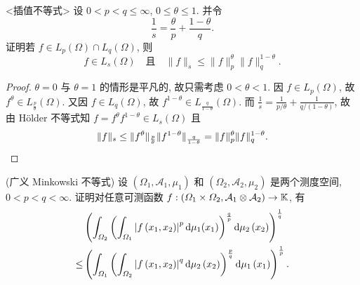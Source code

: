 \begin{exercise}<插值不等式>
    设 $0<p<q\leq\infty$, $0\leq\theta\leq 1$. 并令
    \[\frac{1}{s}=\frac{\theta}{p}+\frac{1-\theta}{q}.\]
    证明若 $f\in L_p(\varOmega)\cap L_q(\varOmega)$, 则
    \[f\in L_s(\varOmega)\quad\text{且}\quad \|f\|_s\leq\|f\|_p^{\theta}\|f\|_q^{1-\theta}.\]
\end{exercise}

\begin{proof}
    $\theta=0$ 与 $\theta=1$ 的情形是平凡的, 故只需考虑 $0<\theta<1$.
    因 $f\in L_p(\varOmega)$, 故 $f^{\theta}\in L_{\frac{p}{\theta}}(\varOmega)$.
    又因 $f\in L_q(\varOmega)$, 故 $f^{1-\theta}\in L_{\frac{q}{1-\theta}}(\varOmega)$.
    而 $\frac{1}{s}=\frac{1}{p/\theta}+\frac{1}{q/(1-\theta)}$, 故由 H\"older 不等式知
    $f=f^{\theta}f^{1-\theta}\in L_s(\varOmega)$ 且
    \[\|f\|_s\leq\|f^{\theta}\|_{\frac{p}{\theta}} \|f^{1-\theta}\|_{\frac{q}{1-\theta}}=\|f\|_p^{\theta} \|f\|_q^{1-\theta}.\qedhere\]
\end{proof}


\begin{exercise}(广义 Minkowski 不等式) 
    设 $\left(\varOmega_{1}, \mathcal{A}_{1}, \mu_{1}\right)$ 
    和 $\left(\varOmega_{2}, \mathcal{A}_{2}, \mu_{2}\right)$ 是两个测度空间, $0<p<q<\infty$. 
    证明对任意可测函数 
    $f:\left(\varOmega_{1} \times \varOmega_{2}, \mathcal{A}_{1} \otimes \mathcal{A}_{2}\right) \rightarrow\mathbb{K}$, 有
    \begin{align*}
        &\left(\int_{\varOmega_{2}}\left(\int_{\varOmega_{1}}\left|f\left(x_{1}, x_{2}\right)\right|^{p}\mathop{}\!\mathrm{d}\mu_{1}(x_{1})\right)^{\frac{q}{p}}\mathop{}\!\mathrm{d} \mu_{2}\left(x_{2}\right)\right)^{\frac{1}{q}} \\
   \leq &\left(\int_{\varOmega_{1}}\left(\int_{\varOmega_{2}}\left|f\left(x_{1}, x_{2}\right)\right|^{q}\mathop{}\!\mathrm{d}\mu_{2}\left(x_{2}\right)\right)^{\frac{p}{q}}\mathop{}\!\mathrm{d}\mu_{1}\left(x_{1}\right)\right)^{\frac{1}{p}}.
    \end{align*}
\end{exercise}

